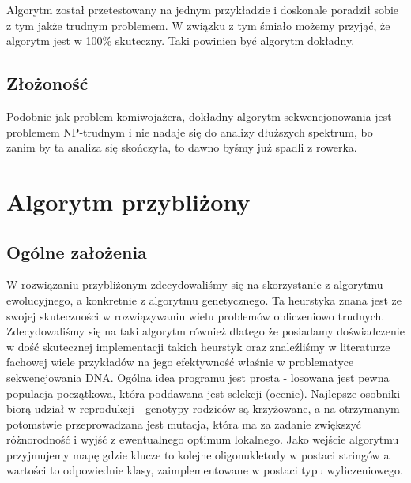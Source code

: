 \documentclass{article}
\begin{document}
Algorytm został przetestowany na jednym przykładzie i doskonale poradził sobie z tym jakże trudnym problemem. W związku z tym śmiało możemy przyjąć, że algorytm jest w 100\% skuteczny. Taki powinien być algorytm dokładny.

\subsection{Złożoność}

Podobnie jak problem komiwojażera, dokładny algorytm sekwencjonowania jest problemem NP-trudnym i nie nadaje się do analizy dłuższych spektrum, bo zanim by ta analiza się skończyła, to dawno byśmy już spadli z rowerka.

\section{Algorytm przybliżony}
\subsection{Ogólne założenia}
W rozwiązaniu przybliżonym zdecydowaliśmy się na skorzystanie z algorytmu ewolucyjnego, a konkretnie z algorytmu genetycznego. Ta heurstyka znana jest ze swojej skuteczności w rozwiązywaniu wielu problemów obliczeniowo trudnych. Zdecydowaliśmy się na taki algorytm również dlatego że posiadamy doświadczenie w dość skutecznej implementacji takich heurstyk oraz znaleźliśmy w literaturze fachowej wiele przykładów na jego efektywność właśnie w problematyce sekwencjowania DNA. Ogólna idea programu jest prosta - losowana jest pewna populacja początkowa, która poddawana jest selekcji (ocenie). Najlepsze osobniki biorą udział w reprodukcji - genotypy rodziców są krzyżowane, a na otrzymanym potomstwie przeprowadzana jest mutacja, która ma za zadanie zwiększyć różnorodność i wyjść z ewentualnego optimum lokalnego. Jako wejście algorytmu przyjmujemy mapę gdzie klucze to kolejne oligonukletody w postaci stringów a wartości to odpowiednie klasy, zaimplementowane w postaci typu wyliczeniowego.
\end{document}
